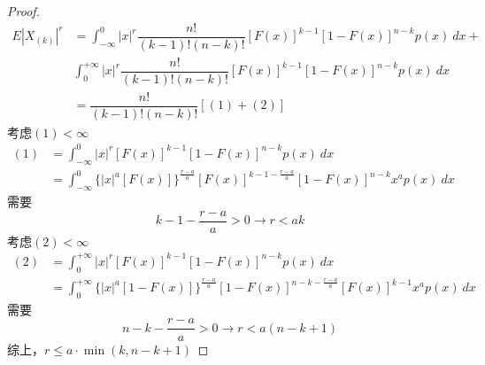 \begin{proof}
    \[
        \begin{array}{ll}
            E|X_{(k)}|^{r} &= \displaystyle\int_{-\infty}^{0}|x|^r\dfrac{n!}{(k-1)!(n-k)!}[F(x)]^{k-1}[1-F(x)]^{n-k}p(x)\ dx+\\
            & \displaystyle\int_{0}^{+\infty}|x|^r\dfrac{n!}{(k-1)!(n-k)!}[F(x)]^{k-1}[1-F(x)]^{n-k}p(x)\ dx\\
            &=\dfrac{n!}{(k-1)!(n-k)!}[(1) + (2)]
        \end{array}
    \]
    考虑$(1)<\infty$
    \[
        \begin{array}{ll}
            (1) &= \displaystyle\int_{-\infty}^{0}|x|^r[F(x)]^{k-1}[1-F(x)]^{n-k}p(x)\ dx\\
            &=\displaystyle\int_{-\infty}^{0}\{|x|^{a}[F(x)]\}^{\frac{r-a}{a}}[F(x)]^{k-1-\frac{r-a}{a}}[1-F(x)]^{n-k}x^ap(x)\ dx
        \end{array}
    \]
    需要
    \[
        k-1-\dfrac{r-a}{a}>0\rightarrow r<ak      
    \]
    考虑$(2)<\infty$
    \[
        \begin{array}{ll}
            (2) &= \displaystyle\int_{0}^{+\infty}|x|^r[F(x)]^{k-1}[1-F(x)]^{n-k}p(x)\ dx\\
            &=\displaystyle\int_{0}^{+\infty}   \{|x|^{a}[1-F(x)]\}^{\frac{r-a}{a}}[1-F(x)]^{n-k-\frac{r-a}{a}}[F(x)]^{k-1}x^ap(x)\ dx
        \end{array}
    \]
    需要
    \[
        n-k-\dfrac{r-a}{a}>0\rightarrow r<a(n-k+1)      
    \]
    综上，$r\leqslant a\cdot\min(k,n-k+1)$
\end{proof}

